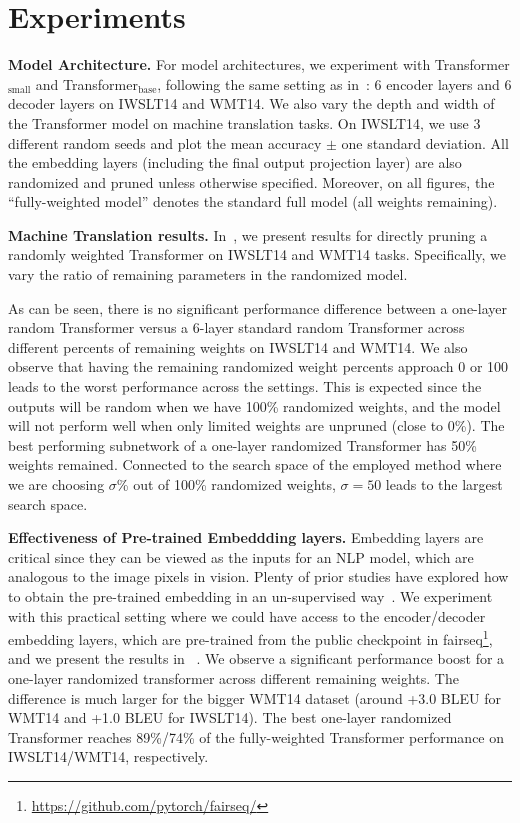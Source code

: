\section{Experiments}
\label{sec:empirical_results}


\noindent\textbf{Model Architecture.}
For model architectures, we experiment with Transformer$_\text{small}$ and Transformer$_\text{base}$, following the same setting as in~\citet{Ott:2018scaling}: 6 encoder layers and 6 decoder layers on IWSLT14 and WMT14. 
We also vary the depth and width of the Transformer model on machine translation tasks. 
On IWSLT14, we use 3 different random seeds and plot the mean accuracy $\pm$ one standard deviation. 
All the embedding layers (including the final output projection layer) are also randomized and pruned unless otherwise specified. 
Moreover, on all figures, the ``fully-weighted model'' denotes the standard full model (all weights remaining). 

\noindent\textbf{Machine Translation results.}
In~, we present results for directly pruning a randomly weighted Transformer on IWSLT14 and WMT14 tasks. 
Specifically, we vary the ratio of remaining parameters in the randomized model.

As can be seen, there is no significant performance difference between a one-layer random Transformer versus a 6-layer standard random Transformer across different percents of remaining weights on IWSLT14 and WMT14. 
We also observe that having the remaining randomized weight percents approach 0 or 100 leads to the worst performance across the settings. 
This is expected since the outputs will be random when we have 100\% randomized weights, and the model will not perform well when only limited weights are unpruned (close to 0\%). 
The best performing subnetwork of a one-layer randomized Transformer has 50\% weights remained. 
Connected to the search space of the employed method where we are choosing $\sigma$\% out of 100\% randomized weights, $\sigma=50$ leads to the largest search space. 



\noindent\textbf{Effectiveness of Pre-trained Embeddding layers.}
Embedding layers are critical since they can be viewed as the inputs for an NLP model, which are analogous to the image pixels in vision. 
Plenty of prior studies have explored how to obtain the pre-trained embedding in an un-supervised way~\citep{mikolov2013efficient,pennington-etal-2014-glove}. 
We experiment with this practical setting where we could have access to the encoder/decoder embedding layers, which are pre-trained from the public checkpoint in fairseq\footnote{\href{https://github.com/pytorch/fairseq/}{https://github.com/pytorch/fairseq/}}, and we present the results in ~. 
We observe a significant performance boost for a one-layer randomized transformer across different remaining weights. 
The difference is much larger for the bigger WMT14 dataset (around +3.0 BLEU for WMT14 and +1.0 BLEU for IWSLT14). 
The best one-layer randomized Transformer reaches 89\%/74\% of the fully-weighted Transformer performance on IWSLT14/WMT14, respectively.  


